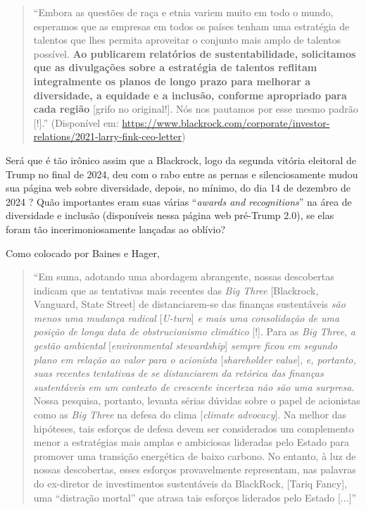 \documentclass[12pt]{article}
\begin{document}
\begin{quote}
    ``Embora as questões de raça e etnia variem muito em todo o mundo, esperamos que as empresas em todos os países tenham uma estratégia de talentos que lhes permita aproveitar o conjunto mais amplo de talentos possível. \textbf{Ao publicarem relatórios de sustentabilidade, solicitamos que as divulgações sobre a estratégia de talentos reflitam integralmente os planos de longo prazo para melhorar a diversidade, a equidade e a inclusão, conforme apropriado para cada região} {[}grifo no original!{]}. Nós nos pautamos por esse mesmo padrão {[}!{]}.'' (Disponível em: \url{https://www.blackrock.com/corporate/investor-relations/2021-larry-fink-ceo-letter})
\end{quote}

Será que é tão irônico assim que a Blackrock, logo da segunda vitória eleitoral de Trump no final de 2024, deu com o rabo entre as pernas e silenciosamente mudou
sua página web sobre diversidade, depois, no mínimo, do dia 14 de
dezembro de 2024 \cite{Johnson2025a}? Quão importantes eram suas várias
``\textit{awards and recognitions}'' na área de diversidade e inclusão
(disponíveis nessa página web pré-Trump 2.0), se elas foram tão
incerimoniosamente lançadas ao oblívio?

Como colocado por Baines e Hager,
\begin{quote}
    ``Em suma, adotando uma abordagem abrangente, nossas descobertas indicam que as tentativas mais recentes das \textit{Big Three} [Blackrock, Vanguard, State Street] de distanciarem-se das finanças sustentáveis \textit{são menos uma mudança radical} [\textit{U-turn}] \textit{e mais uma consolidação de uma posição de longa data de obstrucionismo climático} {[}!{]}. Para as \textit{Big Three}, \textit{a gestão ambiental} [\textit{environmental stewardship}] \textit{sempre ficou em segundo plano em relação ao valor para o acionista} [\textit{shareholder value}], \textit{e, portanto, suas recentes tentativas de se distanciarem da retórica das finanças sustentáveis em um contexto de crescente incerteza não são uma surpresa}. Nossa pesquisa, portanto, levanta sérias dúvidas sobre o papel de acionistas como as \textit{Big Three} na defesa do clima [\textit{climate advocacy}]. Na melhor das hipóteses, tais esforços de defesa devem ser considerados um complemento menor a estratégias mais amplas e ambiciosas lideradas pelo Estado para promover uma transição energética de baixo carbono. No entanto, à luz de nossas descobertas, esses esforços provavelmente representam, nas palavras do ex-diretor de investimentos sustentáveis da BlackRock, {[}Tariq Fancy{]}, uma ``distração mortal'' que atrasa tais esforços liderados pelo Estado [...]'' \cite[p.~451-2; grifo meu]{Baines2023}
\end{quote}
\end{document}
